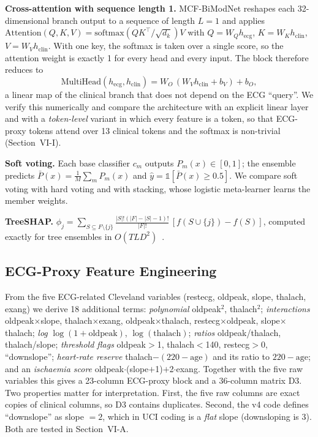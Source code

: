 \textbf{Cross-attention with sequence length 1.} MCF-BiModNet reshapes each 32-dimensional branch output to a sequence of length $L=1$ and applies $\mathrm{Attention}(Q,K,V)=\mathrm{softmax}(QK^\top/\sqrt{d_k})V$ with $Q=W_Q h_{\text{ecg}}$, $K=W_K h_{\text{clin}}$, $V=W_V h_{\text{clin}}$. With one key, the softmax is taken over a single score, so the attention weight is exactly 1 for every head and every input. The block therefore reduces to
\begin{equation}
\mathrm{MultiHead}(h_{\text{ecg}}, h_{\text{clin}}) = W_O\,(W_V h_{\text{clin}} + b_V) + b_O ,
\end{equation}
a linear map of the clinical branch that does not depend on the ECG ``query''. We verify this numerically and compare the architecture with an explicit linear layer and with a \emph{token-level} variant in which every feature is a token, so that ECG-proxy tokens attend over 13 clinical tokens and the softmax is non-trivial (Section~VI-I).

\textbf{Soft voting.} Each base classifier $c_m$ outputs $P_m(x)\in[0,1]$; the ensemble predicts $\bar P(x) = \frac1M\sum_m P_m(x)$ and $\hat y = \mathbb{1}[\bar P(x)\geq 0.5]$. We compare soft voting with hard voting and with stacking, whose logistic meta-learner learns the member weights.

\textbf{TreeSHAP.} $\phi_j = \sum_{S\subseteq F\setminus\{j\}} \frac{|S|!(|F|-|S|-1)!}{|F|!}\,[f(S\cup\{j\}) - f(S)]$, computed exactly for tree ensembles in $O(TLD^2)$~\cite{lundberg2018tree}.

\subsection{ECG-Proxy Feature Engineering}
From the five ECG-related Cleveland variables (restecg, oldpeak, slope, thalach, exang) we derive 18 additional terms:
\emph{polynomial} oldpeak$^2$, thalach$^2$;
\emph{interactions} oldpeak$\times$slope, thalach$\times$exang, oldpeak$\times$thalach, restecg$\times$oldpeak, slope$\times$thalach;
\emph{log} $\log(1+\text{oldpeak})$, $\log(\text{thalach})$;
\emph{ratios} oldpeak/thalach, thalach/slope;
\emph{threshold flags} oldpeak$>$1, thalach$<$140, restecg$>$0, ``downslope'';
\emph{heart-rate reserve} thalach$-(220-\text{age})$ and its ratio to $220-\text{age}$;
and an \emph{ischaemia score} oldpeak$\cdot$(slope$+$1)$+$2$\cdot$exang.
Together with the five raw variables this gives a 23-column ECG-proxy block and a 36-column matrix D3. Two properties matter for interpretation. First, the five raw columns are exact copies of clinical columns, so D3 contains duplicates. Second, the v4 code defines ``downslope'' as slope $=2$, which in UCI coding is a \emph{flat} slope (downsloping is 3). Both are tested in Section~VI-A.

